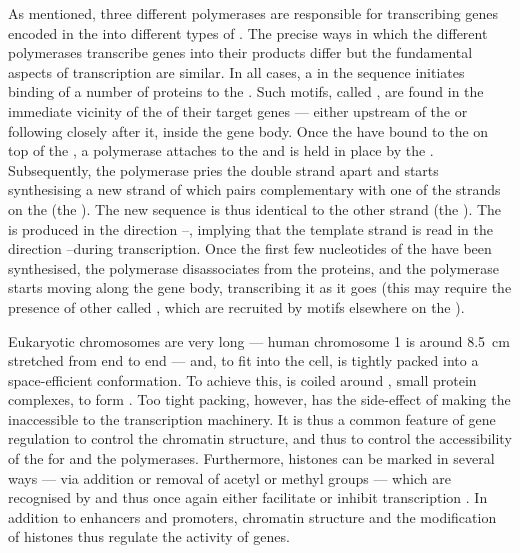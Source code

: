 As mentioned, three different polymerases are responsible for transcribing genes
encoded in the \dna into different types of \rna. The precise ways in which the
different polymerases transcribe genes into their \rna products differ but the
fundamental aspects of transcription are similar. In all cases, a
 in the \dna sequence
initiates binding of a number of \tf proteins to the \dna. Such motifs, called
, are found in the immediate vicinity of the \tss of their
target genes --- either upstream of the \tss or following closely after it,
inside the gene body. Once the \tf[s] have bound to the \dna on top of the \tss,
a polymerase attaches to the \dna and is held in place by the \tf[s].
Subsequently, the polymerase pries the double strand apart and starts
synthesising a new strand of \rna which pairs complementary with one of the
strands on the \dna (the ). The new \rna[’s] sequence is
thus identical to the other \dna strand (the ). The \rna
is produced in the direction \fivep--\threep, implying that the template strand
is read in the direction \threep--\fivep during transcription. Once the first
few nucleotides of the \rna have been synthesised, the polymerase disassociates
from the \tf proteins, and the polymerase starts moving along the gene body,
transcribing it as it goes (this may require the presence of other \tf[s] called
, which are recruited by  motifs elsewhere
on the \dna).

Eukaryotic chromosomes are very long — human chromosome \num{1} is around
\SI{8.5}{\centi\metre} stretched from end to end — and, to fit into the cell, is
tightly packed into a space-efficient conformation. To achieve this, \dna is
coiled around , small protein complexes, to form
. Too tight packing, however, has the
side-effect of making the \dna inaccessible to the transcription machinery. It
is thus a common feature of gene regulation to control the chromatin structure,
and thus to control the accessibility of the \dna for \tf[s] and the
polymerases. Furthermore, histones can be marked in several ways — via addition
or removal of acetyl or methyl groups — which are recognised by \tf[s] and thus
once again either facilitate or inhibit transcription \citep{Alberts:2002}. In
addition to enhancers and promoters, chromatin structure and the modification of
histones thus regulate the activity of genes.

